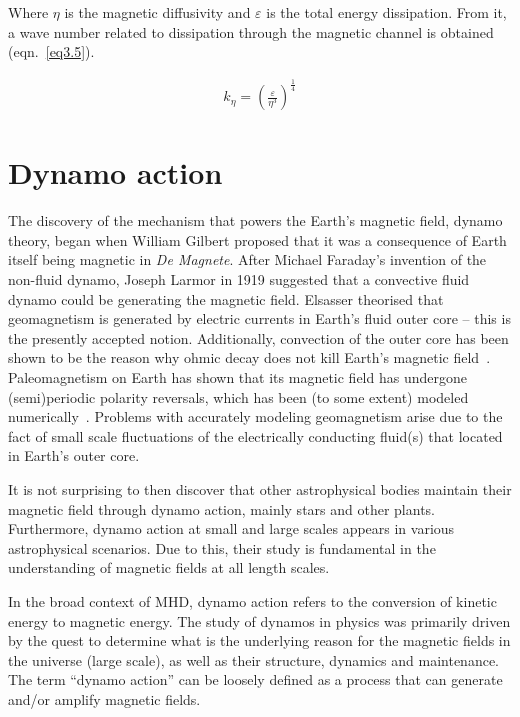 \documentclass[12pt,a4paper]{report}
\begin{document}
Where $\eta$ is the magnetic diffusivity and $\varepsilon$ is the total energy dissipation. From it, a wave number related to dissipation through the magnetic channel is obtained (eqn.~\ref{eq3.5}).

\begin{align}
 k_\eta = \left( \frac{\varepsilon}{\eta^3} \right)^{\frac{1}{4}} \label{eq3.5}
\end{align}

\section{Dynamo action}

The discovery of the mechanism that powers the Earth's magnetic field, dynamo theory, began when William Gilbert proposed that it was a consequence of Earth itself being magnetic in \textit{De Magnete}. After Michael Faraday's invention of the non-fluid dynamo, Joseph Larmor in 1919 suggested that a convective fluid dynamo could be generating the magnetic field. Elsasser theorised that geomagnetism is generated by electric currents in Earth's fluid outer core -- this is the presently accepted notion. Additionally, convection of the outer core has been shown to be the reason why ohmic decay does not kill Earth's magnetic field~\cite{stern2002millennium}. Paleomagnetism on Earth has shown that its magnetic field has undergone (semi)periodic polarity reversals, which has been (to some extent) modeled numerically~\cite{glatzmaier1995three}. Problems with accurately modeling geomagnetism arise due to the fact of small scale fluctuations of the electrically conducting fluid(s) that located in Earth's outer core.

It is not surprising to then discover that other astrophysical bodies maintain their magnetic field through dynamo action, mainly stars and other plants. Furthermore, dynamo action at small and large scales appears in various astrophysical scenarios. Due to this, their study is fundamental in the understanding of magnetic fields at all length scales.

In the broad context of MHD, dynamo action refers to the conversion of kinetic energy to magnetic energy. The study of dynamos in physics was primarily driven by the quest to determine what is the underlying reason for the magnetic fields in the universe (large scale), as well as their structure, dynamics and maintenance. The term ``dynamo action'' can be loosely defined as a process that can generate and/or amplify magnetic fields. 
\end{document}
